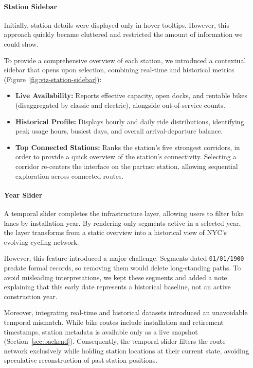 \paragraph{Station Sidebar}
Initially, station details were displayed only in hover tooltips.
However, this approach quickly became cluttered and restricted the amount of information we could show.

To provide a comprehensive overview of each station, we introduced a contextual sidebar that opens upon selection, combining real-time and historical metrics (Figure~\ref{fig:viz-station-sidebar}):
\begin{itemize}
    \item \textbf{Live Availability:} Reports effective capacity, open docks, and rentable bikes (disaggregated by classic and electric), alongside out-of-service counts.
    \item \textbf{Historical Profile:} Displays hourly and daily ride distributions, identifying peak usage hours, busiest days, and overall arrival-departure balance.
    \item \textbf{Top Connected Stations:} Ranks the station's five strongest corridors, in order to provide a quick overview of the station's connectivity.
    Selecting a corridor re-centers the interface on the partner station, allowing sequential exploration across connected routes.
\end{itemize}

\paragraph{Year Slider}
A temporal slider completes the infrastructure layer, allowing users to filter bike lanes by installation year.
By rendering only segments active in a selected year, the layer transforms from a static overview into a historical view of NYC's evolving cycling network.

However, this feature introduced a major challenge.
Segments dated \texttt{01/01/1900} predate formal records, so removing them would delete long-standing paths. 
To avoid misleading interpretations, we kept these segments and added a note explaining that this early date represents a historical baseline, not an active construction year.

Moreover, integrating real-time and historical datasets introduced an unavoidable temporal mismatch.
While bike routes include installation and retirement timestamps, station metadata is available only as a live snapshot (Section~\ref{sec:backend}).
Consequently, the temporal slider filters the route network exclusively while holding station locations at their current state, avoiding speculative reconstruction of past station positions.

